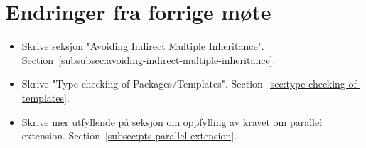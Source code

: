 
\chapter*{Endringer fra forrige møte}

\begin{itemize}
    \item Skrive seksjon "Avoiding Indirect Multiple Inheritance".
    Section~\vref{subsubsec:avoiding-indirect-multiple-inheritance}.
    \item Skrive "Type-checking of Packages/Templates".
    Section~\vref{sec:type-checking-of-templates}.
    \item Skrive mer utfyllende på seksjon om oppfylling av kravet om parallel extension.
    Section~\vref{subsec:pts-parallel-extension}.
\end{itemize}

